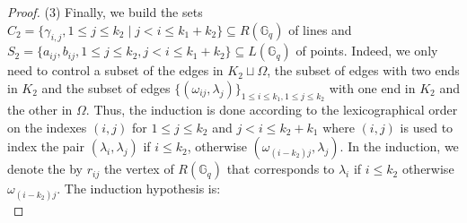 \documentclass[a4paper,UKenglish,cleveref, autoref, thm-restate]{arxiv}
\newcommand{\ls}{\leqslant}
\newcommand{\G}[1][q]{\mathbb{G}_{#1}}
\begin{document}
\begin{proof}
        (3) Finally, we build the sets $C_2=\{\gamma_{i,j}, 1 \ls j \ls k_2 \mid j < i \ls k_1 + k_2\} \subseteq R(\G)$ of lines and $S_2 = \{a_{ij}, b_{ij}, 1 \ls j \ls k_2, j < i \ls k_1 + k_2 \} \subseteq L(\G)$ of points. Indeed, we only need to control a subset of the edges in $K_2 \sqcup \Omega$, the subset of edges with two ends in $K_2$ and the subset of edges $\{(\omega_{ij}, \lambda_j)\}_{1 \ls i \ls k_1, 1 \ls j \ls k_2}$ with one end in $K_2$ and the other in $\Omega$.
        Thus, the induction is done according to the lexicographical order on the indexes $(i,j)$ for $1 \ls j \ls k_2$ and $j < i \ls k_2 + k_1$ where $(i,j)$ is used to index the pair $(\lambda_i, \lambda_j)$ if $i \ls k_2$, otherwise $(\omega_{(i-k_2)j}, \lambda_j)$. In the induction, we denote the by $r_{ij}$ the vertex of $R(\G)$ that corresponds to $\lambda_i$ if $i \ls k_2$ otherwise $\omega_{(i-k_2)j}$. 
        The induction hypothesis is: \\


\end{proof}
\end{document}
